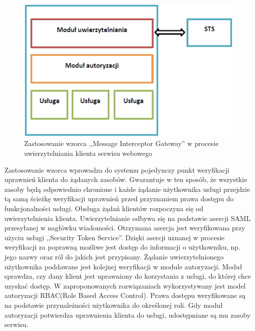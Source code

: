 		\begin{figure}[h]
			\centering
			\includegraphics{img/interceptorGateway.jpg}
			\caption{Zastosowanie wzorca ,,Message Interceptor Gateway'' w procesie uwierzytelniania klienta serwisu webowego}
			\label{Zastosowanie wzorca ,,Message Interceptor Gateway'' w procesie uwierzytelniania klienta serwisu webowego}
		\end{figure}

		Zastosowanie wzorca wprowadza do systemu pojedynczy punkt weryfikacji uprawnień klienta do żądanych zasobów. Gwarantuje w ten sposób, że wszystkie zasoby będą odpowiednio chronione i każde żądanie użytkownika usługi przejdzie tą samą ścieżkę weryfikacji uprawnień przed przyznaniem prawa dostępu do funkcjonalności usługi. Obsługa żądań klientów rozpoczyna się od uwierzytelnienia klienta. Uwierzytelnianie odbywa się na podstawie asercji SAML przesyłanej w nagłówku wiadomości. Otrzymana asercja jest weryfikowana przy użyciu usługi ,,Security Token Service''. Dzięki asercji uznanej w procesie weryfikacji za poprawną możliwe jest dostęp do informacji o użytkowniku, np. jego nazwy oraz ról do jakich jest przypisany. Żądanie uwierzytelnionego użytkownika poddawane jest kolejnej weryfikacji w module autoryzacji. Moduł sprawdza, czy dany klient jest uprawniony do korzystania z usługi, do której chce uzyskać dostęp. W zaproponowanych rozwiązaniach wykorzystywany jest model autoryzacji RBAC(Role Based Access Control). Prawa dostępu weryfikowane są na podstawie przynależności użytkownika do określonej roli. Gdy moduł autoryzacji potwierdza uprawnienia klienta do usługi, udostępniane są mu zasoby serwisu.


